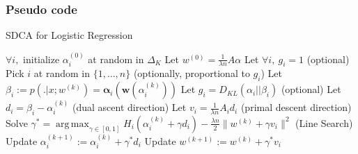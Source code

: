 \documentclass{beamer}
\DeclareMathOperator{\1}{\mathbb{1}}
\DeclareMathOperator*{\argmax}{arg\,max}
\begin{document}
\begin{frame}[fragile]
\frametitle{Pseudo code}

\begin{algorithm}[H]
    \caption{SDCA for Logistic Regression}
    \label{sdca for logreg}
\begin{algorithmic}
        \STATE $\forall i,$ initialize $\alpha_i^{(0)}$ at random in $\Delta_K$
        \STATE Let $w^{(0)} = \frac{1}{\lambda n} A \alpha$  
        \STATE Let $\forall i,\  g_i = 1$ (optional)
                \STATE Pick $i$ at random in $\{1,\ldots,n\}$ (optionally, proportional to $g_i$)
                \STATE Let $ \beta_i := p( . |x ; w^{(k)}) = \bm \alpha_i(\bm w(\alpha_i^{(k)}))$ 
                \STATE Let $g_i = D_{KL}(\alpha_i || \beta_i)$ (optional)
                \STATE Let $d_i = \beta_i - \alpha_i^{(k)}$ (dual ascent direction)
                \STATE Let $v_i = \frac{1}{\lambda n} A_i d_i $ (primal descent direction)
                \STATE Solve $\gamma^* = \argmax_{\gamma \in [0,1]} H_i(\alpha_i^{(k)} + \gamma d_i) - \frac{\lambda n}{2} \| w^{(k)} + \gamma v_i \|^2$ (Line Search)
               \STATE Update $\alpha_i^{(k+1)} := \alpha_i^{(k)} + \gamma^* d_i$
               \STATE Update $w^{(k+1)} := w^{(k)} + \gamma^* v_i $
        \ENDFOR
\end{algorithmic}
\end{algorithm}
\end{frame}
\end{document}

